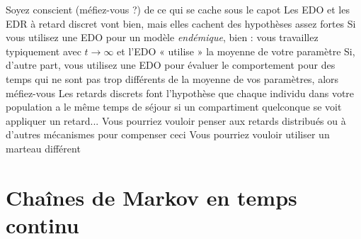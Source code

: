 \documentclass[aspectratio=169]{beamer}\usepackage[]{graphicx}\usepackage[]{xcolor}
\begin{document}
\begin{frame}{Soyez conscient (méfiez-vous ?) de ce qui se cache sous le capot}
Les EDO et les EDR à retard discret vont bien, mais elles cachent des hypothèses assez fortes
\vfill
Si vous utilisez une EDO pour un modèle \emph{endémique}, bien : vous travaillez typiquement avec $t\to\infty$ et l'EDO « utilise » la moyenne de votre paramètre
\vfill
Si, d'autre part, vous utilisez une EDO pour évaluer le comportement pour des temps qui ne sont pas trop différents de la moyenne de vos paramètres, alors méfiez-vous
\vfill
Les retards discrets font l'hypothèse que chaque individu dans votre population a le même temps de séjour si un compartiment quelconque se voit appliquer un retard... Vous pourriez vouloir penser aux retards distribués ou à d'autres mécanismes pour compenser ceci
\vfill
Vous pourriez vouloir utiliser un marteau différent
\end{frame}

\section{Chaînes de Markov en temps continu}
\end{document}
